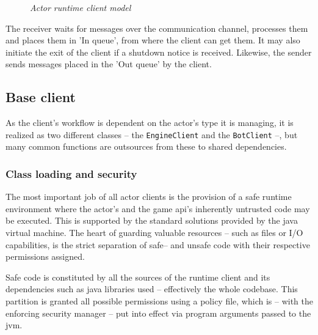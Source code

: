 \documentclass[11pt,a4paper,oneside]{report}
\newcommand{\code}{\texttt}
\begin{document}
\begin{figure}[h]
		\caption*{\emph{Actor runtime client model}}
	\end{figure}
	
	The receiver waits for messages over the communication channel, processes them and places them in 'In queue', from where the client can get them. It may also initiate the exit of the client if a shutdown notice is received. Likewise, the sender sends messages placed in the 'Out queue' by the client.
	
		\subsection{Base client}

			As the client's workflow is dependent on the actor's type it is managing, it is realized as two different classes -- the \code{EngineClient} and the \code{BotClient} --, but many common functions are outsources from these to shared dependencies.

			\subsubsection*{Class loading and security}
		
			The most important job of all actor clients is the provision of a safe runtime environment where the actor's and the game api's inherently untrusted code may be executed. This is supported by the standard solutions provided by the java virtual machine. The heart of guarding valuable resources -- such as files or \mbox{I/O} capabilities, is the strict separation of safe-- and unsafe code with their respective permissions assigned.
			
			Safe code is constituted by all the sources of the runtime client and its dependencies such as java libraries used -- effectively the whole codebase. This partition is granted all possible permissions using a policy file, which is -- with the enforcing security manager -- put into effect via program arguments passed to the jvm.
\end{document}
